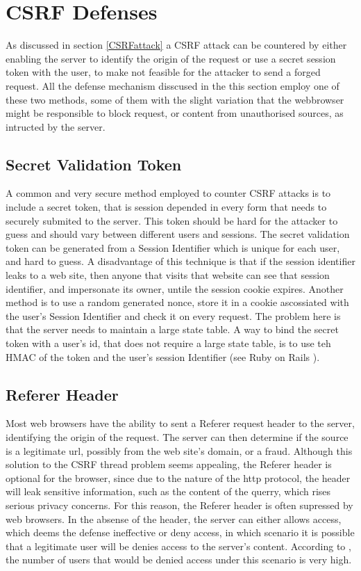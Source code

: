 \label{defenses}
\section{CSRF Defenses}
As discussed in section \ref{CSRFattack} a CSRF attack can be countered by either enabling the server to
identify the origin of the request or use a secret session token with the user, to make not feasible for
the attacker to send a forged request.  All the defense mechanism disscused in the this section employ one
of these two methods, some of them with the slight variation that the webbrowser might be responsible to block
request, or content from unauthorised sources, as intructed by the server.

\subsection{Secret Validation Token}
A common and very secure method employed to counter CSRF attacks is to include a secret token, that is session 
depended in every form that needs to securely submited to the server.  This token should be hard for the attacker
to guess and should vary between different users and sessions.  The secret validation token can be generated from 
a Session Identifier which is unique for each user, and hard to guess. A disadvantage of this technique is that if 
the session identifier leaks to a web site, then anyone that visits that website can see that session identifier, and 
impersonate its owner, untile the session cookie expires. Another method is to use a random generated nonce,
store it in a cookie ascossiated with the user's Session Identifier and check it on every request. The problem here is 
that the server needs to maintain a large state table. A way to bind the secret token with a user's id, that does not
require a large state table, is to use teh HMAC of the token and the user's session Identifier (see Ruby on Rails 
\cite{website:ruby}).

\subsection{Referer Header}
Most web browsers have the ability to sent a Referer request header to the server, identifying the origin of the request.
The server can then determine if the source is a legitimate url, possibly from the web site's domain, or a fraud.  Although
this solution to the CSRF thread problem seems appealing, the Referer header is optional for the browser, since due to the
nature of the http protocol, the header will leak sensitive information, such as the content of the querry, which rises
serious privacy concerns.  For this reason, the Referer header is often supressed by web browsers.  In the absense of the
header, the server can either allows access, which deems the defense ineffective or deny access, in which scenario it is
possible that a legitimate user will be denies access to the server's content.  According to \cite{Barth:2008:RDC:1455770.1455782},
the number of users that would be denied access under this scenario is very high.  

